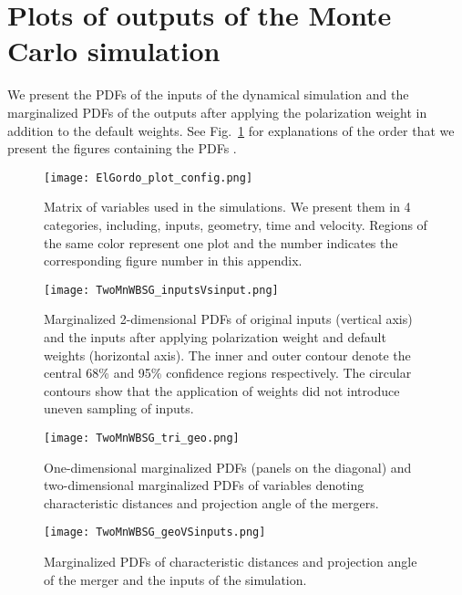 \section{Plots of outputs of the Monte Carlo simulation}
We present the PDFs of the inputs of the dynamical simulation and the
marginalized PDFs of the outputs after applying the polarization weight in
addition to the default weights. See Fig.~\ref{fig:plot_config} for explanations of
the order that we present the figures containing the PDFs . 
\begin{figure}
	\begin{center}
	\texttt{[image: ElGordo\_plot\_config.png]}
	\end{center}
	\caption{Matrix of variables used in the simulations. We present them in
	4 categories, including, inputs, geometry, time and velocity. Regions of
	the same color represent one plot and the number
indicates the corresponding figure number in this appendix.
\label{fig:plot_config}
}
\end{figure}
\label{app:results}
\clearpage
\begin{figure*}
	\begin{minipage}{180mm}
	\begin{center}
	\texttt{[image: TwoMnWBSG\_inputsVsinput.png]}
	\caption{Marginalized 2-dimensional PDFs of original inputs (vertical axis) 
		and the inputs after applying polarization weight and default weights 
		(horizontal axis). The inner and outer contour
denote the central 68\% and 95\% confidence regions respectively.
The circular contours show that the application of weights did not introduce
uneven sampling of inputs. }
	\end{center}
	\end{minipage}
\end{figure*}
\begin{figure*}
\begin{minipage}{180mm}
	\begin{center}
	\texttt{[image: TwoMnWBSG\_tri\_geo.png]}
	\caption{One-dimensional marginalized PDFs (panels on the diagonal) and
		two-dimensional marginalized PDFs of variables
		denoting characteristic distances and projection angle of the mergers.
	\label{fig:geom_geom}
	}
	\end{center}
	\end{minipage}
\end{figure*}
\begin{figure*}
\begin{minipage}{180mm}
	\begin{center}
	\texttt{[image: TwoMnWBSG\_geoVSinputs.png]}
	\caption{Marginalized PDFs of characteristic distances and projection
		angle of the merger and the inputs of the simulation.}
	\end{center}
	\end{minipage}
\end{figure*}
